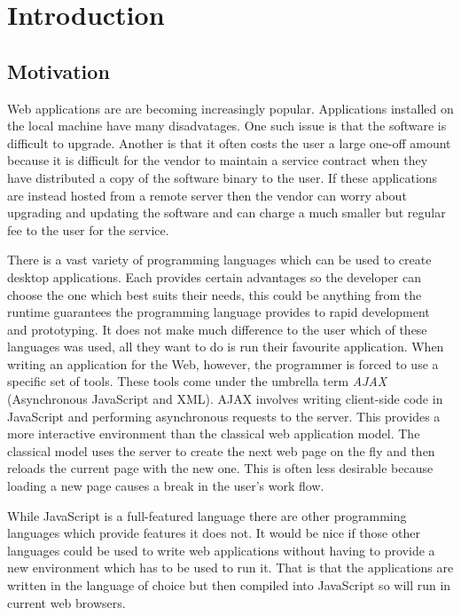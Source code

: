\chapter{Introduction}

\section{Motivation}
Web applications are are becoming increasingly popular. Applications installed on the local machine have many disadvatages. One such issue is that the software is difficult to upgrade. Another is that it often costs the user a large one-off amount because it is difficult for the vendor to maintain a service contract when they have distributed a copy of the software binary to the user. If these applications are instead hosted from a remote server then the vendor can worry about upgrading and updating the software and can charge a much smaller but regular fee to the user for the service.\cite{bib:road_ahead}

There is a vast variety of programming languages which can be used to create desktop applications. Each provides certain advantages so the developer can choose the one which best suits their needs, this could be anything from the runtime guarantees the programming language provides to rapid development and prototyping. It does not make much difference to the user which of these languages was used, all they want to do is run their favourite application. When writing an application for the Web, however, the programmer is forced to use a specific set of tools. These tools come under the umbrella term \emph{AJAX} (Asynchronous JavaScript and XML). AJAX involves writing client-side code in JavaScript and performing asynchronous requests to the server. This provides a more interactive environment than the classical web application model. The classical model uses the server to create the next web page on the fly and then reloads the current page with the new one. This is often less desirable because loading a new page causes a break in the user's work flow.\cite{bib:ajax}

While JavaScript is a full-featured language there are other programming languages which provide features it does not. It would be nice if those other languages could be used to write web applications without having to provide a new environment which has to be used to run it. That is that the applications are written in the language of choice but then compiled into JavaScript so will run in current web browsers.

